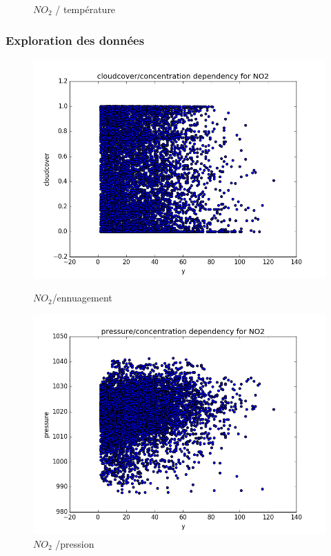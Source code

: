 \documentclass{beamer}
\begin{document}
\begin{frame}
\begin{figure}[H]
  \caption{$NO_2$ / température}
	\endminipage\hfill
\end{figure}
\end{frame}

\begin{frame}
  \frametitle{Exploration des données}
\begin{figure}[H]
	\captionsetup{labelformat=empty}
	\includegraphics[width=\linewidth]{images/NO2_cloud_y.png}
  \caption{$NO_2$/ennuagement}
	\endminipage\hfill
	\includegraphics[width=\linewidth]{images/NO2_pressure_y.png}
  \caption{$NO_2$ /pression}
	\endminipage\hfill

\end{figure}
\end{frame}
\end{document}
